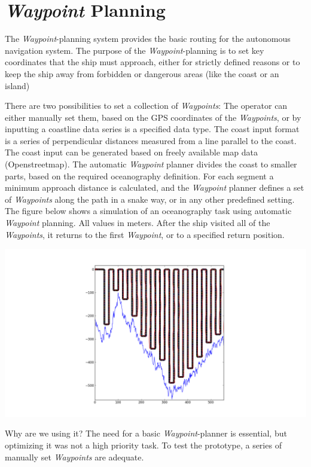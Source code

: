 \section{\emph{Waypoint} Planning}

The \emph{Waypoint}-planning system provides the basic routing for the autonomous navigation system.
The purpose of the \emph{Waypoint}-planning is to set key coordinates that the ship must approach, either for strictly defined reasons or to keep the ship away from forbidden or dangerous areas (like the coast or an island)

There are two possibilities to set a collection of \emph{Waypoints}: The operator can either manually set them, based on the GPS coordinates of the \emph{Waypoints}, or by inputting a coastline data series is a specified data type. The coast input format is a series of perpendicular distances measured from a line parallel to the coast. The coast input can be generated based on freely available map data (Openstreetmap).
The automatic \emph{Waypoint} planner divides the coast to smaller parts, based on the required oceanography definition. For each segment a minimum approach distance is calculated, and the \emph{Waypoint} planner defines a set of \emph{Waypoints} along the path in a snake way, or in any other predefined setting. The figure below shows a simulation of an oceanography task using automatic \emph{Waypoint} planning. All values in meters.
After the ship visited all of the \emph{Waypoints}, it returns to the first \emph{Waypoint}, or to a specified return position.

\includegraphics[width = \textwidth]{img/LocalPlannerFigures/Auto_WP_Planning.png}

Why are we using it?
The need for a basic \emph{Waypoint}-planner is essential, but optimizing it was not a high priority task. To test the prototype, a series of manually set \emph{Waypoints} are adequate.


